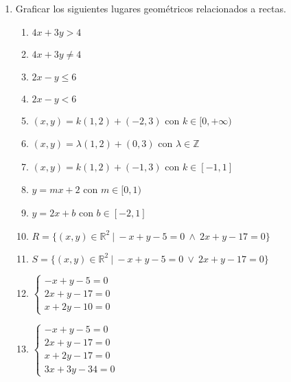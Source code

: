 \documentclass[a4paper]{article}
\newcommand{\exercise}{\item}
\begin{document}
\begin{enumerate}
\begin{enumerate} [label=(\alph*)]
		\item $r: (x,y)=k(3,-2)+(10,5)$ con $k\in\mathbb{R}$ ~~y~~ $s: 2x+3y-35=0$.

	\end{enumerate}
	
	\exercise Graficar los siguientes lugares geométricos relacionados a rectas.
	\begin{multicols}{2}
	\begin{enumerate} [label=(\alph*)]
		
		\item $4x+3y > 4$

		\item $4x+3y \neq 4$

		\item $2x-y \leq 6$

		\item $2x-y < 6$

		\item $(x,y)=k(1,2)+(-2,3)$ con $k\in[0,+\infty)$

		\item $(x,y)=\lambda(1,2)+(0,3)$ con $\lambda\in\mathbb{Z}$

		\item $(x,y)=k(1,2)+(-1,3)$ con $k\in[-1,1]$

		\item $y=mx+2$ con $m\in[0,1)$

		\item $y=2x+b$ con $b\in[-2,1]$

		\item $R=\{(x,y) \in \mathbb{R}^2 ~|~ -x+y-5=0 ~\land~ 2x+y-17=0 \}$

		\item $S=\{(x,y) \in \mathbb{R}^2 ~|~ -x+y-5=0 ~\lor~ 2x+y-17=0 \}$

		\item $\left\{\begin{matrix}-x+y-5=0 \\ 2x+y-17=0 \\ x+2y-10=0 \end{matrix}\right.$

		\item $\left\{\begin{matrix}-x+y-5=0 \\ 2x+y-17=0 \\ x+2y-17=0 \\ 3x+3y-34=0 \end{matrix}\right.$
	

\end{enumerate}
\end{multicols}
\end{enumerate}
\end{document}

